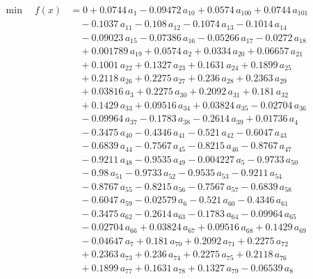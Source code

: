 \documentclass[a4paper,11pt]{article}
\begin{document}
\begin{align}
\min\quad f(x) &= 0 + 0.0744\,a_{1} - 0.09472\,a_{10} + 0.0574\,a_{100} + 0.0744\,a_{101} \nonumber\\
&\quad - 0.1037\,a_{11} - 0.108\,a_{12} - 0.1074\,a_{13} - 0.1014\,a_{14} \nonumber\\
&\quad - 0.09023\,a_{15} - 0.07386\,a_{16} - 0.05266\,a_{17} - 0.0272\,a_{18} \nonumber\\
&\quad + 0.001789\,a_{19} + 0.0574\,a_{2} + 0.0334\,a_{20} + 0.06657\,a_{21} \nonumber\\
&\quad + 0.1001\,a_{22} + 0.1327\,a_{23} + 0.1631\,a_{24} + 0.1899\,a_{25} \nonumber\\
&\quad + 0.2118\,a_{26} + 0.2275\,a_{27} + 0.236\,a_{28} + 0.2363\,a_{29} \nonumber\\
&\quad + 0.03816\,a_{3} + 0.2275\,a_{30} + 0.2092\,a_{31} + 0.181\,a_{32} \nonumber\\
&\quad + 0.1429\,a_{33} + 0.09516\,a_{34} + 0.03824\,a_{35} - 0.02704\,a_{36} \nonumber\\
&\quad - 0.09964\,a_{37} - 0.1783\,a_{38} - 0.2614\,a_{39} + 0.01736\,a_{4} \nonumber\\
&\quad - 0.3475\,a_{40} - 0.4346\,a_{41} - 0.521\,a_{42} - 0.6047\,a_{43} \nonumber\\
&\quad - 0.6839\,a_{44} - 0.7567\,a_{45} - 0.8215\,a_{46} - 0.8767\,a_{47} \nonumber\\
&\quad - 0.9211\,a_{48} - 0.9535\,a_{49} - 0.004227\,a_{5} - 0.9733\,a_{50} \nonumber\\
&\quad - 0.98\,a_{51} - 0.9733\,a_{52} - 0.9535\,a_{53} - 0.9211\,a_{54} \nonumber\\
&\quad - 0.8767\,a_{55} - 0.8215\,a_{56} - 0.7567\,a_{57} - 0.6839\,a_{58} \nonumber\\
&\quad - 0.6047\,a_{59} - 0.02579\,a_{6} - 0.521\,a_{60} - 0.4346\,a_{61} \nonumber\\
&\quad - 0.3475\,a_{62} - 0.2614\,a_{63} - 0.1783\,a_{64} - 0.09964\,a_{65} \nonumber\\
&\quad - 0.02704\,a_{66} + 0.03824\,a_{67} + 0.09516\,a_{68} + 0.1429\,a_{69} \nonumber\\
&\quad - 0.04647\,a_{7} + 0.181\,a_{70} + 0.2092\,a_{71} + 0.2275\,a_{72} \nonumber\\
&\quad + 0.2363\,a_{73} + 0.236\,a_{74} + 0.2275\,a_{75} + 0.2118\,a_{76} \nonumber\\
&\quad + 0.1899\,a_{77} + 0.1631\,a_{78} + 0.1327\,a_{79} - 0.06539\,a_{8} \nonumber\\

\end{align}
\end{document}
